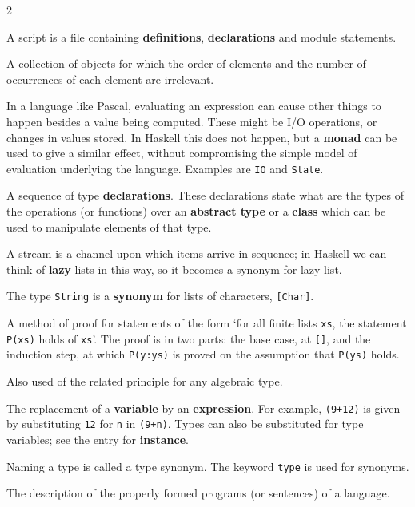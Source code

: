 \begin{multicols}{2}
{
A script is a file containing \textbf{definitions}, \textbf{declarations} and
module statements.

A collection of objects for which the order of elements and the number of
occurrences of each element are irrelevant.

In a language like Pascal, evaluating an expression can cause other things to
happen besides a value being computed. These might be I/O operations, or
changes in values stored. In Haskell this does not happen, but a \textbf{monad}
can be used to give a similar effect, without compromising the simple model of
evaluation underlying the language. Examples are \texttt{IO} and \texttt{State}.

A sequence of type \textbf{declarations}. These declarations state what are the
types of the operations (or functions) over an \textbf{abstract type} or a 
\textbf{class} which can be
used to manipulate elements of that type.

A stream is a channel upon which items arrive in sequence; in Haskell we can
think of \textbf{lazy} lists in this way, so it becomes a synonym for lazy list.

The type \texttt{String} is a \textbf{synonym} for lists of characters, \texttt{[Char]}.

A method of proof for statements of the form `for all
finite lists 
\texttt{xs}, the statement \texttt{P(xs)} holds of \texttt{xs}'. The proof is in two parts: the
base case, at \texttt{[]}, and the induction step, at which \texttt{P(y:ys)} is proved
on the assumption that \texttt{P(ys)} holds. 

\noindent
Also used of the related principle
for any algebraic type.

The replacement of a \textbf{variable} by an \textbf{expression}. For example, 
\texttt{(9+12)} is given by substituting \texttt{12} for \texttt{n} in \texttt{(9+n)}.
Types can also be substituted for type variables; see the entry for 
\textbf{instance}.

Naming a type is called a type synonym. The keyword \texttt{type} is used for
synonyms.

The description of the properly formed programs (or sentences) of a language.

}
\end{multicols}
